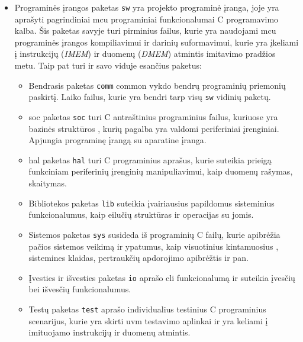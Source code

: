\begin{itemize}
	\item Programinės įrangos paketas \texttt{sw} yra projekto programinė įranga, joje yra aprašyti pagrindiniai \gls{mcu} programiniai funkcionalumai C programavimo kalba. Šis paketas savyje turi pirminius failus, kurie yra naudojami \gls{mcu} programinės įrangos kompiliavimui ir darinių suformavimui, kurie yra įkeliami į  instrukcijų (\textit{IMEM}) ir duomenų (\textit{DMEM}) atmintis imitavimo pradžios metu. Taip pat turi ir savo viduje esančius paketus:

	      \begin{itemize}
		      \item Bendrasis paketas \texttt{comm} {common} vykdo bendrų programinių priemonių paskirtį. Laiko failus, kurie yra bendri tarp visų \texttt{sw} vidinių paketų.
		      \item \gls{soc} paketas \texttt{soc} turi C antraštinius  programinius failus, kuriuose yra bazinės struktūros , kurių pagalba yra valdomi  periferiniai įrenginiai. Apjungia programinę įrangą su aparatine įranga.
		      \item \gls{hal} paketas \texttt{hal} turi C programinius aprašus, kurie suteikia prieigą funkciniam periferinių įrenginių manipuliavimui, kaip duomenų rašymas, skaitymas.
		      \item Bibliotekos paketas \texttt{lib}  suteikia įvairiausius papildomus sisteminius funkcionalumus, kaip eilučių  struktūras ir operacijas su jomis.
		      \item Sistemos paketas \texttt{sys}  susideda iš programinių C failų, kurie apibrėžia pačios sistemos veikimą ir ypatumus, kaip visuotinius kintamuosius , sistemines klaidas, pertraukčių  apdorojimo apibrėžtis ir pan.
		      \item Įvesties ir išvesties paketas \texttt{io}  aprašo \gls{cli} funkcionalumą ir suteikia įvesčių bei išvesčių funkcionalumus.
		      \item  Testų paketas \texttt{test} aprašo individualius testinius C programinius scenarijus, kurie yra skirti \gls{uvm} testavimo aplinkai ir yra keliami į  imituojamo  instrukcijų ir duomenų atmintis.
	      \end{itemize}


\end{itemize}
